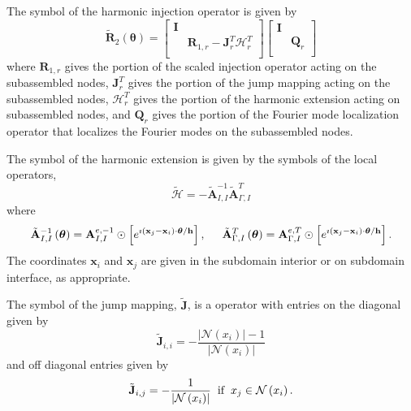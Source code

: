 \documentclass[review]{siamart190516}
\begin{document}
\begin{definition}
The symbol of the harmonic injection operator is given by
\begin{equation}
\tilde{\mathbf{R}}_2 \left( \boldsymbol{\theta} \right) =
\begin{bmatrix}
\mathbf{I} &                                                                  \\
           & \mathbf{R}_{1, r} - \mathbf{J}^T_r \boldsymbol{\mathcal{H}}^T_r  \\
\end{bmatrix}
\begin{bmatrix}
\mathbf{I} &                 \\
           & \mathbf{Q}_{r}  \\
\end{bmatrix}
\end{equation}
where $\mathbf{R}_{1, r}$ gives the portion of the scaled injection operator acting on the subassembled nodes, $\mathbf{J}^T_r$ gives the portion of the jump mapping acting on the subassembled nodes, $\boldsymbol{\mathcal{H}}^T_r$ gives the portion of the harmonic extension acting on subassembled nodes, and $\mathbf{Q}_r$ gives the portion of the Fourier mode localization operator that localizes the Fourier modes on the subassembled nodes.

The symbol of the harmonic extension is given by the symbols of the local operators,
\begin{equation}
\tilde{\boldsymbol{\mathcal{H}}} = - \tilde{\mathbf{A}}_{I, I}^{-1} \tilde{\mathbf{A}}_{\Gamma, I}^T
\end{equation}
where
\begin{equation}
\tilde{\mathbf{A}}_{I, I}^{-1} \left( \boldsymbol{\theta} \right) = \mathbf{A}_{I, I}^{e, -1} \odot \left[ e^{\imath \left( \mathbf{x}_j - \mathbf{x}_i \right) \cdot \boldsymbol{\theta} / \mathbf{h}} \right],
\hspace{5mm}
\tilde{\mathbf{A}}_{\Gamma, I}^T \left( \boldsymbol{\theta} \right) = \mathbf{A}_{\Gamma, I}^{e, T} \odot \left[ e^{\imath \left( \mathbf{x}_j - \mathbf{x}_i \right) \cdot \boldsymbol{\theta} / \mathbf{h}} \right].
\end{equation}
The coordinates $\mathbf{x}_i$ and $\mathbf{x}_j$ are given in the subdomain interior or on subdomain interface, as appropriate.

The symbol of the jump mapping, $\tilde{\mathbf{J}}$, is a operator with entries on the diagonal given by
\begin{equation}
\tilde{\mathbf{J}}_{i, i} = - \frac{\lvert \mathcal{N} \left( x_i \right) \rvert - 1}{\lvert \mathcal{N} \left( x_i \right) \rvert}
\end{equation}
and off diagonal entries given by
\begin{equation}
\tilde{\mathbf{J}}_{i, j} = - \frac{1}{\lvert \mathcal{N} \left( x_i \right) \rvert} \hspace{2mm} \text{if} \hspace{2mm} x_j \in \mathcal{N} \left( x_i \right).
\end{equation}
\label{def:harmonic_injection_symbol}
\end{definition}
\end{document}
